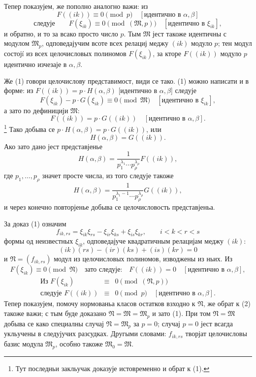 ﻿\documentclass[11pt]{article}
\providecommand{\frM}{\mathfrak M}
\providecommand{\frN}{\mathfrak N}
\begin{document}
Тепер показујем, же пополно аналогно важи: из
\[
        F((ik))\equiv0\pmod p\quad [\text{идентично в \(\alpha,\beta\)}]
\]
\begin{equation}
        \text{следује}\qquad
        F(\xi_{ik})\equiv0\pmod{(\frM,p)}\quad [\text{идентично в \(\xi_{ik}\)}],
\end{equation}
и обратно, и то за всако просто число \(p\). Тым \(\frM\) јест такоже идентичны с модулом \(\frM_p\), одповедајучим всоте всех релациј меджу \((ik)\) модуло \(p\); тен модул состојí из всех целочисловых полиномов \(F(\xi_{ik})\), за кторе \(F((ik))\) модуло \(p\) идентично изчезаје в \(\alpha,\beta\).

Же (1) говори целочислову представимост, види се тако. (1) можно написати и в форме: из \(F((ik))=p\cdot H(\alpha,\beta)\) [идентично в \(\alpha,\beta\)] следује
\[
        F(\xi_{ik})-p\cdot G(\xi_{ik})\equiv0\pmod{\frM}
        \quad [\text{идентично в \(\xi_{ik}\)}],
\]
а зато по дефиницији \(\frM\):
\[
        F((ik))=p\cdot G((ik))\quad [\text{идентично в \(\alpha,\beta\)}].
\]
\footnote{Тут последньи закльучак доказује истовременно и обрат к (1).}
Тако добыва се \(p\cdot H(\alpha,\beta)=p\cdot G((ik))\), или
\[
        H(\alpha,\beta)=G((ik)).
\]
Ако зато дано јест представјенье
\[
        H(\alpha,\beta)
        =
        \frac1{p_1^{\lambda_1}\cdots p_\rho^{\lambda_\rho}}
        F((ik)),
\]
где \(p_1,\ldots,p_\rho\) значет просте числа, из того следује такоже
\[
        H(\alpha,\beta)
        =
        \frac1{p_1^{\lambda_1-1}\cdots p_\rho^{\lambda_\rho}}
        G((ik)),
\]
и через конечно повторјенье добыва се целочисловость представјеньа.

За доказ (1) означим
\[
        f_{ik,rs}=\xi_{ik}\xi_{rs}-\xi_{ir}\xi_{ks}+\xi_{is}\xi_{kr},
        \qquad i<k<r<s
\]
формы од неизвестных \(\xi_{ik}\), одповедајуче квадратичным релацијам меджу \((ik)\):
\[
        (ik)(rs)-(ir)(ks)+(is)(kr)=0
\]
и \(\frN=(f_{ik,rs})\) модул из целочисловых полиномов, изводжены из ньих. Из
\[
        F(\xi_{ik})\equiv0\pmod{\frN}
        \quad\text{зато следује:}\quad
        F((ik))=0\quad [\text{идентично в \(\alpha,\beta\)}],
\]
\begin{equation}
\begin{array}{rcl}
        \text{Из }F(\xi_{ik})&\equiv&0\pmod{(\frN,p)}\\
        \text{следује }F((ik))&\equiv&0\pmod p\quad[\text{идентично в \(\alpha,\beta\)}].
\end{array}
\end{equation}
Тепер показујем, помочу нормованьа класов остатков взходно к \(\frN\), же обрат к (2) такоже важи; с тым буде доказано \(\frN=\frM=\frM_p\) и зато (1). При том \(\frN=\frM\) добыва се како специалны случај \(\frN=\frM_p\) за \(p=0\); случај \(p=0\) јест всагда укльучены в следујучих разсудках. Другыми словами: \(f_{ik,rs}\) творјат целочисловы базис модула \(\frM_p\), особно такоже \(\frM_0=\frM\).
\end{document}
